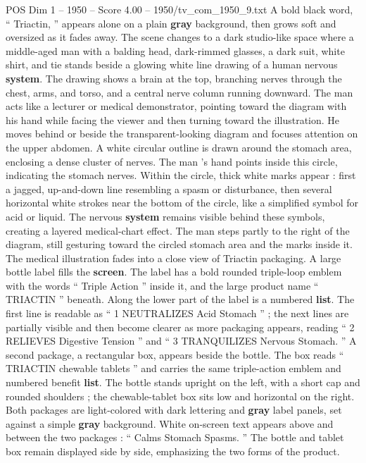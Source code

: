 \begin{textsample}{POS Dim 1 – 1950 – Score 4.00 – 1950/tv\_com\_1950\_9.txt}  \label{ex:f1_pos_088}
A bold black word, “ Triactin, ” appears alone on a plain \textbf{gray} background, then grows soft and oversized as it fades away.
The scene changes to a dark studio-like space where a middle-aged man with a balding head, dark-rimmed glasses, a dark suit, white shirt, and tie stands beside a glowing white line drawing of a human nervous \textbf{system}.
The drawing shows a brain at the top, branching nerves through the chest, arms, and torso, and a central nerve column running downward.
The man acts like a lecturer or medical demonstrator, pointing toward the diagram with his hand while facing the viewer and then turning toward the illustration.
He moves behind or beside the transparent-looking diagram and focuses attention on the upper abdomen.
A white circular outline is drawn around the stomach area, enclosing a dense cluster of nerves.
The man ’s hand points inside this circle, indicating the stomach nerves.
Within the circle, thick white marks appear : first a jagged, up-and-down line resembling a spasm or disturbance, then several horizontal white strokes near the bottom of the circle, like a simplified symbol for acid or liquid.
The nervous \textbf{system} remains visible behind these symbols, creating a layered medical-chart effect.
The man steps partly to the right of the diagram, still gesturing toward the circled stomach area and the marks inside it.
The medical illustration fades into a close view of Triactin packaging.
A large bottle label fills the \textbf{screen}.
The label has a bold rounded triple-loop emblem with the words “ Triple Action ” inside it, and the large product name “ TRIACTIN ” beneath.
Along the lower part of the label is a numbered \textbf{list}.
The first line is readable as “ 1 NEUTRALIZES Acid Stomach ” ; the next lines are partially visible and then become clearer as more packaging appears, reading “ 2 RELIEVES Digestive Tension ” and “ 3 TRANQUILIZES Nervous Stomach. ” A second package, a rectangular box, appears beside the bottle.
The box reads “ TRIACTIN chewable tablets ” and carries the same triple-action emblem and numbered benefit \textbf{list}.
The bottle stands upright on the left, with a short cap and rounded shoulders ; the chewable-tablet box sits low and horizontal on the right.
Both packages are light-colored with dark lettering and \textbf{gray} label panels, set against a simple \textbf{gray} background.
White on-screen text appears above and between the two packages : “ Calms Stomach Spasms. ” The bottle and tablet box remain displayed side by side, emphasizing the two forms of the product.

\end{textsample}
